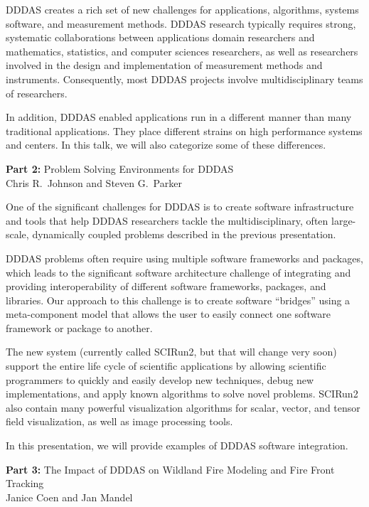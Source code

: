 \documentclass[twosided]{report}
\begin{document}
DDDAS creates a rich set of new challenges for applications,
algorithms, systems software, and measurement methods.
DDDAS research typically requires strong, systematic
collaborations between applications domain researchers and
mathematics, statistics, and computer sciences researchers,
as well as researchers involved in the design and
implementation of measurement methods and instruments.
Consequently, most DDDAS projects involve multidisciplinary
teams of researchers.

In addition, DDDAS enabled applications run in a different
manner than many traditional applications.  They place
different strains on high performance systems and centers.
In this talk, we will also categorize some of these
differences.

{\bf Part 2:} Problem Solving Environments for DDDAS
\\
Chris R.~Johnson and Steven G.~Parker

One of the significant challenges for DDDAS is to create
software infrastructure and tools that help DDDAS
researchers tackle the multidisciplinary, often large-scale,
dynamically coupled problems described in the previous
presentation.

DDDAS problems often require using multiple software
frameworks and packages, which leads to the significant
software architecture challenge of integrating and providing
interoperability of different software frameworks, packages,
and libraries.  Our approach to this challenge is  to create
software ``bridges'' using a meta-component model that allows
the user to easily connect one software framework or package
to another.

The new system (currently called SCIRun2, but that will
change very soon) support the entire life cycle of
scientific applications by allowing scientific programmers
to quickly and easily develop new techniques, debug new
implementations, and apply known algorithms to solve novel
problems.  SCIRun2 also contain many powerful visualization
algorithms for scalar,  vector, and tensor field
visualization, as well as image processing tools.

In this presentation, we will provide examples of DDDAS
software integration.

{\bf Part 3:} The Impact of DDDAS on Wildland Fire Modeling and
Fire Front Tracking
\\
Janice Coen and Jan Mandel
\end{document}
